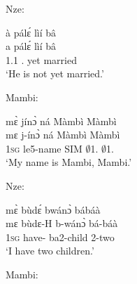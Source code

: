 \noindent Nze:

\begin{exe}[(C234)] 
\exC\label{94}
  \glll  à pálɛ́ lìí bâ \\
      a pálɛ́ lìí bâ \\
          1.{\PST}1 {\NEG}.{\PST}  yet married  \\
    \trans `He is not yet married.'
\end{exe}

\noindent Mambi:

\begin{exe}[(C234)]  
\exC\label{95} 
  \glll mɛ̀ jínɔ̀ ná Màmbì Màmbì  \\
        mɛ j-ínɔ̀ ná Màmbì Màmbì  \\
          1\textsc{sg} le5-name SIM $\emptyset$1.{\PN} $\emptyset$1.{\PN}  \\
    \trans `My name is Mambi, Mambi.'
\end{exe}

\noindent Nze:

\begin{exe}[(C234)] 
\exC\label{96} 
  \glll  mɛ̀ bùdɛ́ bwánɔ̀ bábáà \\
        mɛ bùdɛ-H b-wánɔ̀ bá-báà \\
         1\textsc{sg} have-{\R} ba2-child 2-two   \\
    \trans `I have two children.'
\end{exe}

\noindent Mambi:

